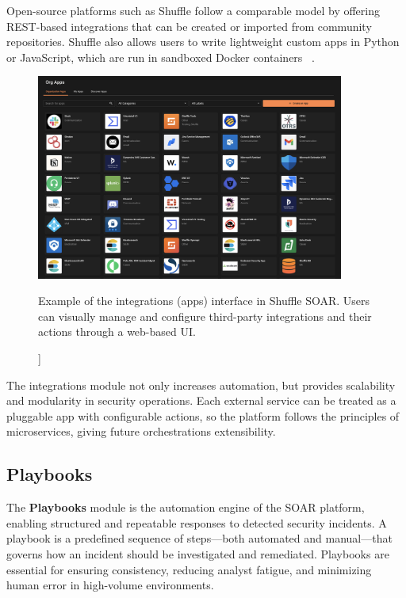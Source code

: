 Open-source platforms such as Shuffle follow a comparable model by offering REST-based integrations that can be created or imported from community repositories. Shuffle also allows users to write lightweight custom apps in Python or JavaScript, which are run in sandboxed Docker containers ~\cite{techtarget}.

\begin{figure}[ht]
    \centering
    \includegraphics[width=0.9\textwidth]{images/shuffle_soar_apps.png}
    \caption[[Example of the integrations (apps) interface in Shuffle SOAR]]{Example of the integrations (apps) interface in Shuffle SOAR. Users can visually manage and configure third-party integrations and their actions through a web-based UI.}
    \label{fig:shuffle-soar-apps}
\end{figure}

The integrations module not only increases automation, but provides scalability and modularity in security operations. Each external service can be treated as a pluggable app with configurable actions, so the platform follows the principles of microservices, giving future orchestrations extensibility.

\subsection{Playbooks}

The \textbf{Playbooks} module is the automation engine of the SOAR platform, enabling structured and repeatable responses to detected security incidents. A playbook is a predefined sequence of steps—both automated and manual—that governs how an incident should be investigated and remediated. Playbooks are essential for ensuring consistency, reducing analyst fatigue, and minimizing human error in high-volume environments.

